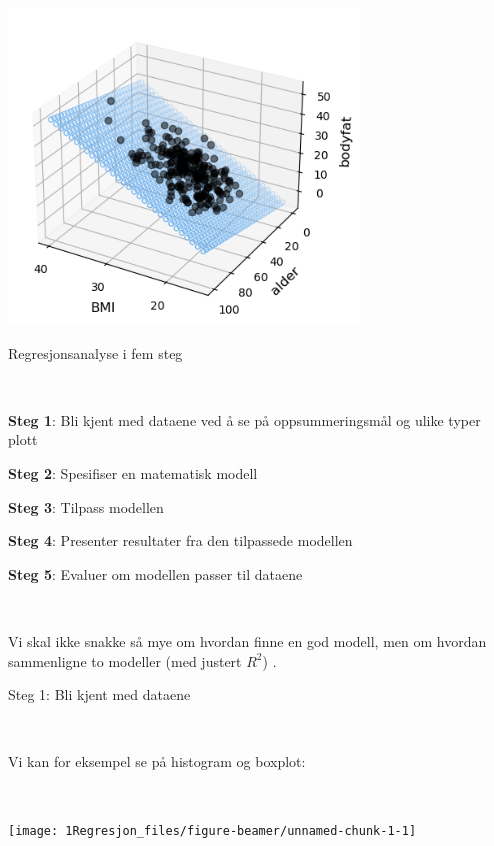\documentclass[10pt,ignorenonframetext,]{beamer}
\begin{document}
\begin{frame}

\centering

\includegraphics[width=0.7\textwidth,height=\textheight]{multippelRegGraph.png}

\end{frame}

\begin{frame}{Regresjonsanalyse i fem steg}
\protect\hypertarget{regresjonsanalyse-i-fem-steg}{}

\(~\)

\textbf{Steg 1}: Bli kjent med dataene ved å se på oppsummeringsmål og
ulike typer plott

\textbf{Steg 2}: Spesifiser en matematisk modell

\textbf{Steg 3}: Tilpass modellen

\textbf{Steg 4}: Presenter resultater fra den tilpassede modellen

\textbf{Steg 5}: Evaluer om modellen passer til dataene

\(~\)

Vi skal ikke snakke så mye om hvordan finne en god modell, men om
hvordan sammenligne to modeller (med justert \(R^2\)) .

\end{frame}

\begin{frame}

\begin{block}{Steg 1: Bli kjent med dataene}

\(~\)

Vi kan for eksempel se på histogram og boxplot:

\(~\)

\begin{center}\texttt{[image: 1Regresjon\_files/figure-beamer/unnamed-chunk-1-1]} \end{center}

\end{block}

\end{frame}
\end{document}
